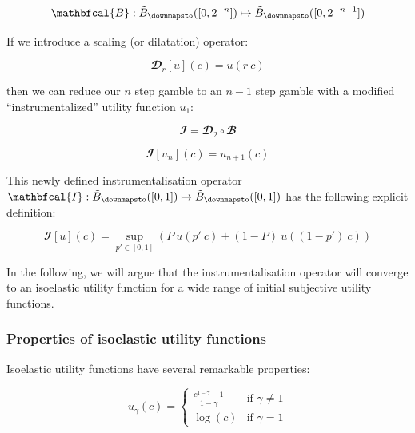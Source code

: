 \documentclass{article}
\theoremstyle{definition}
\begin{document}
\begin{equation}
    \mathbfcal{B} : \tilde{B}_\downmapsto([0,2^{-n}]) \mapsto  \tilde{B}_\downmapsto([0,2^{-n-1}])
\end{equation}

If we introduce a scaling (or dilatation) operator:

\begin{equation}
\label{eq:Dilatation}
    \mathbfcal{D}_r[u](c) = u(r \ c)
\end{equation}

then we can reduce our $n$ step gamble to an $n-1$ step gamble with a modified ``instrumentalized'' \cite{book:ValueTheory} utility function $u_1$:

\begin{equation}
    \mathbfcal{I} = \mathbfcal{D}_2 \circ \mathbfcal{B}
\end{equation}

\begin{equation}
    \mathbfcal{I}[u_n](c) = u_{n+1}(c)
\end{equation}

This newly defined instrumentalisation operator $\mathbfcal{I} : \tilde{B}_\downmapsto([0,1]) \mapsto \tilde{B}_\downmapsto([0,1])$ has the following explicit definition:

\begin{equation}
    \mathbfcal{I}[u](c) = \sup_{p' \in [0,1]} \left ( P \ u(p' \ c) + (1-P) \ u((1-p') \ c) \right )
\end{equation}

In the following, we will argue that the instrumentalisation operator will converge to an isoelastic utility function for a wide range of initial subjective utility functions.

\subsubsection{Properties of isoelastic utility functions}

Isoelastic utility functions have several remarkable properties:

    \begin{equation}
        u_\gamma(c) = 
        \begin{cases}
            \frac{c^{1-\gamma}-1}{1-\gamma} & \text{if } \gamma \ne 1 \\
            \log(c) & \text{if } \gamma = 1 
    \end{cases}
    \end{equation}
\end{document}
